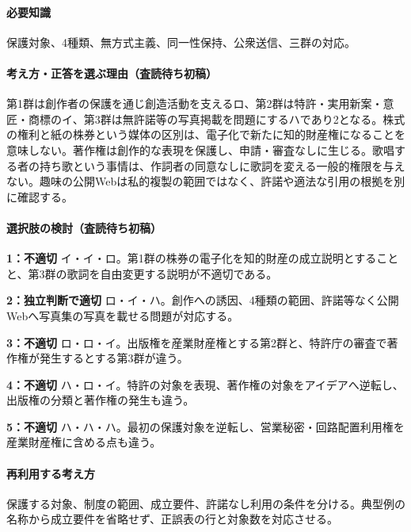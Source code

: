 \paragraph{必要知識} 保護対象、4種類、無方式主義、同一性保持、公衆送信、三群の対応。

\paragraph{考え方・正答を選ぶ理由（査読待ち初稿）} 第1群は創作者の保護を通じ創造活動を支えるロ、第2群は特許・実用新案・意匠・商標のイ、第3群は無許諾等の写真掲載を問題にするハであり2となる。株式の権利と紙の株券という媒体の区別は、電子化で新たに知的財産権になることを意味しない。著作権は創作的な表現を保護し、申請・審査なしに生じる。歌唱する者の持ち歌という事情は、作詞者の同意なしに歌詞を変える一般的権限を与えない。趣味の公開Webは私的複製の範囲ではなく、許諾や適法な引用の根拠を別に確認する。

\paragraph{選択肢の検討（査読待ち初稿）}\mbox{}\par

\noindent\textbf{1：不適切} イ・イ・ロ。第1群の株券の電子化を知的財産の成立説明とすることと、第3群の歌詞を自由変更する説明が不適切である。\par

\noindent\textbf{2：独立判断で適切} ロ・イ・ハ。創作への誘因、4種類の範囲、許諾等なく公開Webへ写真集の写真を載せる問題が対応する。\par

\noindent\textbf{3：不適切} ロ・ロ・イ。出版権を産業財産権とする第2群と、特許庁の審査で著作権が発生するとする第3群が違う。\par

\noindent\textbf{4：不適切} ハ・ロ・イ。特許の対象を表現、著作権の対象をアイデアへ逆転し、出版権の分類と著作権の発生も違う。\par

\noindent\textbf{5：不適切} ハ・ハ・ハ。最初の保護対象を逆転し、営業秘密・回路配置利用権を産業財産権に含める点も違う。\par

\paragraph{再利用する考え方} 保護する対象、制度の範囲、成立要件、許諾なし利用の条件を分ける。典型例の名称から成立要件を省略せず、正誤表の行と対象数を対応させる。

